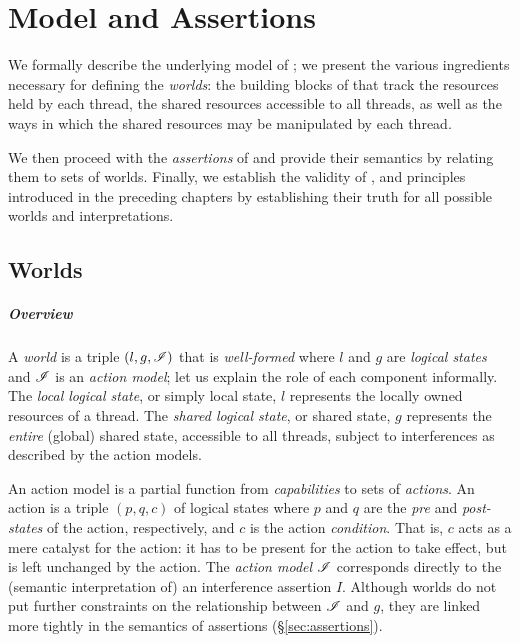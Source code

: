 \chapter{\colosl Model and Assertions}\label{chapter:logic}
We formally describe the underlying model of \colosl; we present the various ingredients necessary for defining the \colosl \emph{worlds}: the building blocks of \colosl that track the resources held by each thread, the shared resources accessible to all threads, as well as the ways in which the shared resources may be manipulated by each thread.

We then proceed with the \emph{assertions} of \colosl and provide their semantics by relating them to sets of worlds. Finally, we establish the validity of \copyRule, \forgetRule and \mergeRule principles introduced in the preceding chapters by establishing their truth for all possible worlds and interpretations.

\section{Worlds}
\paragraph{Overview}
A \emph{world} is a triple $(l, g, \mathscr{I})$ that is \emph{well-formed} where $l$ and $g$ are \emph{logical states} and $\mathscr{I}$ is an \emph{action model}; let us explain the role of each component informally. The \emph{local logical state}, or simply local state, $l$ represents the locally owned resources of a thread. The \emph{shared logical state}, or shared state, $g$ represents the \emph{entire} (global) shared state, accessible to all threads, subject to interferences as described by the action models.

An action model is a partial function from \emph{capabilities} to sets of \emph{actions}. An action is a triple $(p,q, c)$ of logical states where $p$ and $q$ are the \emph{pre} and \emph{post-states} of the action, respectively, and $c$ is the action \emph{condition}. That is, $c$ acts as a mere catalyst for the action: it has to be present for the action to take effect, but is left unchanged by the action. The \emph{action model} $\mathscr{I}$ corresponds directly to the (semantic interpretation of) an interference assertion $I$. Although worlds do not put further constraints on the
relationship between $\mathscr{I}$ and $g$, they are linked more tightly in the semantics of assertions (\S\ref{sec:assertions}).

